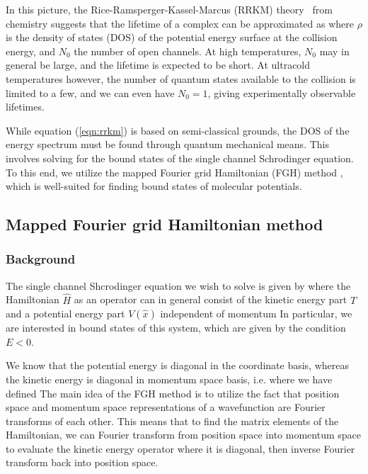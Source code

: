 \documentclass[%
 reprint,
 amsmath,amssymb,
 aps,
 nofootinbib
]{revtex4-1}
\begin{document}
In this picture, the Rice-Ramsperger-Kassel-Marcus (RRKM) theory~\cite{marcus1952-1,marcus1952-2} from chemistry suggests that the lifetime of a complex can be approximated as 
where $\rho$ is the density of states (DOS) of the potential energy surface at the collision energy, and $N_0$ the number of open channels. At high temperatures, $N_0$ may in general be large, and the lifetime is expected to be short. At ultracold temperatures however, the number of quantum states available to the collision is limited to a few, and we can even have $N_0=1$, giving experimentally observable lifetimes. 

While equation (\ref{eqn:rrkm}) is based on semi-classical grounds, the DOS of the energy spectrum must be found through quantum mechanical means. This involves solving for the bound states of the single channel Schrodinger equation. To this end, we utilize the mapped Fourier grid Hamiltonian (FGH) method \cite{clay1989,fattal1996}, which is well-suited for finding bound states of molecular potentials.


\subsection{\label{sec:FGH}Mapped Fourier grid Hamiltonian method}

\subsubsection{\label{sec:FGH-background}Background}

The single channel Shcrodinger equation we wish to solve is given by
where the Hamiltonian $\hat{H}$ as an operator can in general consist of the kinetic energy part $\hat{T}$ and a potential energy part $V(\hat{x})$ independent of momentum
In particular, we are interested in bound states of this system, which are given by the condition $E<0$.

We know that the potential energy is diagonal in the coordinate basis, whereas the kinetic energy is diagonal in momentum space basis, i.e.
where we have defined
The main idea of the FGH method is to utilize the fact that position space and momentum space representations of a wavefunction are Fourier transforms of each other. This means that to find the matrix elements of the Hamiltonian, we can Fourier transform from position space into momentum space to evaluate the kinetic energy operator where it is diagonal, then inverse Fourier transform back into position space.
\end{document}
